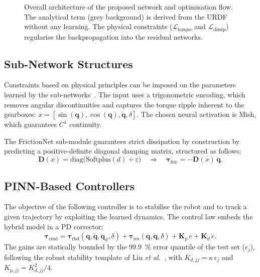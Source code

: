 \documentclass[a4paper, oneside]{article}
\newcommand{\q}{\ensuremath{\boldsymbol{q}}}
\newcommand{\qd}{\ensuremath{\boldsymbol{\dot{q}}}}
\newcommand{\qdd}{\ensuremath{\boldsymbol{\ddot{q}}}}
\newcommand{\taurbd}{\ensuremath{\boldsymbol{\tau}_{\mathrm{rbd}}}}
\newcommand{\taufric}{\ensuremath{\boldsymbol{\tau}_{\mathrm{fric}}}}
\newcommand{\taures}{\ensuremath{\boldsymbol{\tau}_{\mathrm{res}}}}
\newcommand{\taucmd}{\ensuremath{\boldsymbol{\tau}_{\mathrm{cmd}}}}
\begin{document}
\begin{figure}[htbp]
\caption{Overall architecture of the proposed network and optimisation flow. The analytical term (grey background) is derived from the URDF without any learning. The physical constraints ($\mathcal{L}_{\mathrm{torque}}$ and $\mathcal{L}_{\mathrm{dissip}}$) regularise the backpropagation into the residual networks.}
\label{fig-pipeline}
\end{figure}

\subsection{Sub-Network Structures}
\label{sec-algo-structure}

Constraints based on physical principles can be imposed on the parameters learned by the sub-networks~\cite{sutanto2020}. The input uses a trigonometric encoding, which removes angular discontinuities and captures the torque ripple inherent to the gearboxes: $x = [\sin(\q), \cos(\q), \qd, \delta]$. The chosen neural activation is Mish, which guarantees $C^1$ continuity.

The FrictionNet sub-module guarantees strict dissipation by construction by predicting a positive-definite diagonal damping matrix, structured as follows:
%
\begin{equation}
    \boldsymbol{D}(x) = \mathrm{diag}\bigl(\mathrm{Softplus}(d) + \varepsilon\bigr) \quad \Rightarrow \quad \taufric = -\boldsymbol{D}(x)\,\qd .
    \label{eq-Dmat}
\end{equation}

\subsection{PINN-Based Controllers}
\label{sec-algo-control}

The objective of the following controller is to stabilise the robot and to track a given trajectory by exploiting the learned dynamics. The control law embeds the hybrid model in a PD corrector:
%
\begin{equation}
    \taucmd = \taurbd(\q,\qd,\qdd_{\mathrm{d}},\delta) + \taures(\q,\qd,\delta) + \boldsymbol{K}_p\,e + \boldsymbol{K}_d\,\dot{e} .
    \label{eq-ctpd}
\end{equation}
%
The gains are statically bounded by the \SI{99.9}{\percent} error quantile of the test set ($\epsilon_j$), following the robust stability template of Liu \emph{et al.}~\cite{liu2024}, with $K_{d,jj} = \kappa\,\epsilon_j$ and $K_{p,jj} = K_{d,jj}^{2}/4$.
\end{document}
